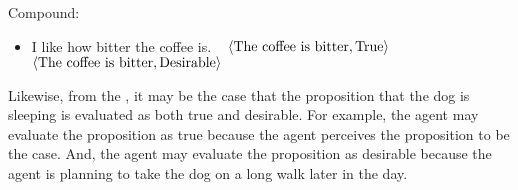 \begin{note}
  Compound:
  \begin{itemize}
  \item I like how bitter the coffee is.\newline
    \mbox{ }\hfill%
    \(\langle \text{The coffee is bitter}, \text{True} \rangle\)\newline
    \mbox{ }\hfill%
    \(\langle \text{The coffee is bitter}, \text{Desirable} \rangle\)
  \end{itemize}

  Likewise, from the \agpe{}, it may be the case that the proposition that the dog is sleeping is evaluated as both true and desirable.
  For example, the agent may evaluate the proposition as true because the agent perceives the proposition to be the case.
  And, the agent may evaluate the proposition as desirable because the agent is planning to take the dog on a long walk later in the day.
\end{note}

